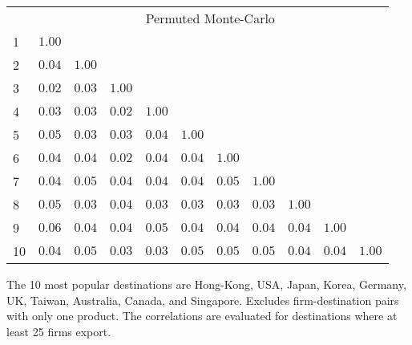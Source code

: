 \documentclass{article}
\begin{document}
\begin{table}[h]
{\begin{threeparttable}
\begin{tabular}{lrrrrrrrrrr}
& \multicolumn{10}{c}{Permuted Monte-Carlo}\\ 
\cmidrule{2-11} 
1  & $1.00$    &              &             &             &              &            &               &            &              &                        \\  
2  & $0.04$    & $1.00$     &             &             &              &            &               &            &              &                        \\  
3  & $0.02$    & $0.03$     & $1.00$    &             &              &            &               &            &              &                        \\  
4  & $0.03$    & $0.03$     & $0.02$    &  $1.00$   &              &            &               &            &              &                        \\  
5  & $0.05$    & $0.03$     & $0.03$    &  $0.04$   & $1.00$     &            &               &            &              &                        \\  
6  & $0.04$    & $0.04$     & $0.02$    &  $0.04$   & $0.04$     &  $1.00$  &               &            &              &                        \\  
7  & $0.04$    & $0.05$     & $0.04$    &  $0.04$   & $0.04$     &  $0.05$  &  $1.00$     &            &              &                        \\  
8  & $0.05$    & $0.03$     & $0.04$    &  $0.03$   & $0.03$     &  $0.03$  &  $0.03$     & $1.00$   &              &                        \\  
9  & $0.06$    & $0.04$     & $0.04$    &  $0.05$   & $0.04$     &  $0.04$  &  $0.04$     & $0.04$   & $1.00$     &                        \\  
10 & $0.04$   & $0.05$    & $0.03$   &  $0.03$  & $0.05$    &  $0.05$ &  $0.05$    & $0.04$  & $0.04$    &   $1.00$           \\  
\hline
\hline
\end{tabular}
\begin{tablenotes}
\small
\item  \noindent  \footnotesize{The 10 most popular destinations are Hong-Kong, USA, Japan, Korea, Germany, UK, Taiwan, Australia, Canada, and Singapore. Excludes firm-destination pairs with only one product. The correlations are evaluated for destinations where at least 25 firms export.}
\end{tablenotes}
\end{threeparttable}
}
\end{table}
\end{document}
